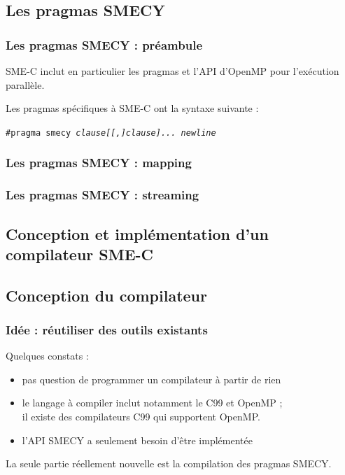 \documentclass{beamer}
\begin{document}
\begin{frame}
\subsection{Les pragmas SMECY}
\frametitle{Les pragmas SMECY : préambule}
SME-C inclut en particulier les pragmas et l'API d'\alert{OpenMP} pour l'exécution parallèle.

\vspace{0.66cm}
Les pragmas spécifiques à SME-C ont la syntaxe suivante :

\alert{\texttt{\#pragma smecy \emph{clause[[,]clause]... newline}}}
\end{frame}


\begin{frame}[fragile]
\frametitle{Les pragmas SMECY : mapping}
\Lstun
\end{frame}


\begin{frame}[fragile]
\frametitle{Les pragmas SMECY : streaming}
\Lstdeux
\end{frame}

\begin{frame}
\section{Conception et implémentation d'un compilateur SME-C}
\subsection{Conception du compilateur}
\frametitle{Idée : réutiliser des outils existants}
Quelques constats :
\begin{itemize}
\item pas question de programmer un compilateur à partir de rien
\item le langage à compiler inclut notamment le C99 et OpenMP ;\\ il existe des compilateurs C99 qui supportent OpenMP. 
\item l'API SMECY a seulement besoin d'être implémentée\\
\end{itemize}
La seule partie réellement nouvelle est la compilation des pragmas SMECY.
\end{frame}
\end{document}
